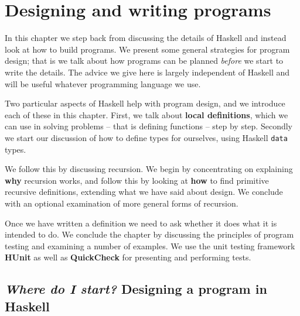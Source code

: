 %

\chapter{Designing and writing programs}
\chapstart
\label{writingProgs}


\medskip
In this chapter we step back from discussing the details of Haskell and
instead look at how to build programs. We present some general strategies
for program design; that is we talk about how programs can be planned
{\em before\/} we start to write the details.
The advice we give here is largely independent of
Haskell and will be useful whatever programming language we use. 


Two particular aspects of Haskell help with program design, and we introduce each of these in this chapter. First, we talk about \textbf{local definitions}, which we can use in solving problems -- that is defining functions -- step by step. Secondly we start our discussion of how to define types for ourselves, using Haskell \texttt{data} types.


We follow this by discussing recursion. We begin by concentrating on explaining \textbf{why} 
recursion works, and follow this by looking at \textbf{how} to find primitive recursive
definitions, extending what we have said about design. We conclude with
an optional examination of more general forms of recursion.

Once we have written a definition we need to ask whether it does what it is
intended to do. We conclude the chapter by discussing the principles of program
testing and examining a number of examples. We use the unit testing framework \textbf{HUnit} as well as \textbf{QuickCheck} for presenting and performing tests.

\begin{webvideos}
\end{webvideos}

\section{{\em Where do I start?} Designing a program in Haskell}
\label{designProgram}
\label{probSolvIntro}

